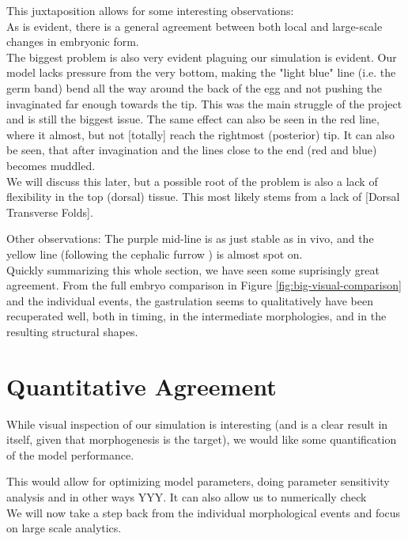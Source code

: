 This juxtaposition allows for some interesting observations:\\
As is evident, there is a general agreement between both local and large-scale changes in embryonic form. \\

The biggest problem is also very evident plaguing our simulation is evident. Our model lacks pressure from the very bottom, making the "light blue" line (i.e. the germ band) bend all the way around the back of the egg and not pushing the invaginated  far enough towards the tip. This was the main struggle of the project and is still the biggest issue. The same effect can also be seen in the red line, where it almost, but not [totally] reach the rightmost (posterior) tip. It can also be seen, that after invagination and the lines close to the end (red and blue) becomes muddled.\\

We will discuss this later, but a possible root of the problem is also a lack of flexibility in the top (dorsal) tissue. This most likely stems from a lack of [Dorsal Transverse Folds]. 

Other observations:
The purple mid-line is as just stable as in vivo, and the yellow line (following the cephalic furrow ) is almost spot on.\\


Quickly summarizing this whole section, we have seen some suprisingly great agreement. From the full embryo comparison in Figure \ref{fig:big-visual-comparison} and the individual events, the gastrulation seems to qualitatively have been recuperated well, both in timing, in the intermediate morphologies, and in the resulting structural shapes. 


\section{Quantitative Agreement}

While visual inspection of our simulation is interesting (and is a clear result in itself, given that morphogenesis is the target), we would like some quantification of the model performance. 

This would allow for optimizing model parameters, doing parameter sensitivity analysis and in other ways YYY. It can also allow us to numerically check 
\\
We will now take a step back from the individual morphological events and focus on large scale analytics.

